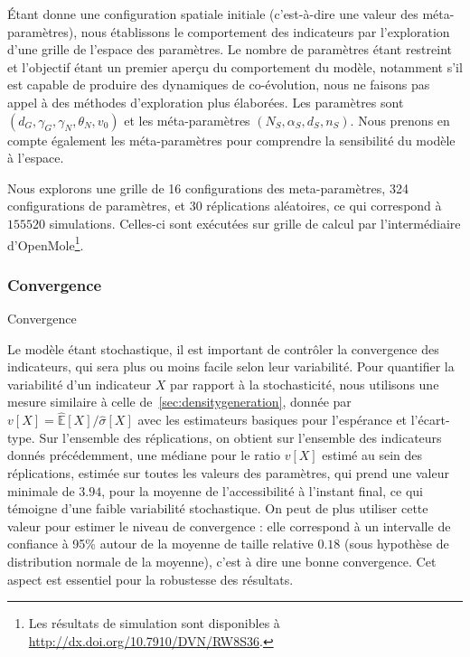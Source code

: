 Étant donne une configuration spatiale initiale (c'est-à-dire une valeur des méta-paramètres), nous établissons le comportement des indicateurs par l'exploration d'une grille de l'espace des paramètres. Le nombre de paramètres étant restreint et l'objectif étant un premier aperçu du comportement du modèle, notamment s'il est capable de produire des dynamiques de co-évolution, nous ne faisons pas appel à des méthodes d'exploration plus élaborées. Les paramètres sont $(d_G,\gamma_G,\gamma_N,\theta_N,v_0)$ et les méta-paramètres $(N_S,\alpha_S,d_S,n_S)$. Nous prenons en compte également les méta-paramètres pour comprendre la sensibilité du modèle à l'espace.

Nous explorons une grille de 16 configurations des meta-paramètres, 324 configurations de paramètres, et 30 réplications aléatoires, ce qui correspond à $155520$ simulations. Celles-ci sont exécutées sur grille de calcul par l'intermédiaire d'OpenMole\footnote{Les résultats de simulation sont disponibles à \url{http://dx.doi.org/10.7910/DVN/RW8S36}.}.



\subsubsection{Convergence}{Convergence}


Le modèle étant stochastique, il est important de contrôler la convergence des indicateurs, qui sera plus ou moins facile selon leur variabilité. Pour quantifier la variabilité d'un indicateur $X$ par rapport à la stochasticité, nous utilisons une mesure similaire à celle de~\ref{sec:densitygeneration}, donnée par $v\left[X\right] = \hat{\mathbb{E}}\left[X\right]/\hat{\sigma}\left[X\right]$ avec les estimateurs basiques pour l'espérance et l'écart-type. Sur l'ensemble des réplications, on obtient sur l'ensemble des indicateurs donnés précédemment, une médiane pour le ratio $v\left[X\right]$ estimé au sein des réplications, estimée sur toutes les valeurs des paramètres, qui prend une valeur minimale de $3.94$, pour la moyenne de l'accessibilité à l'instant final, ce qui témoigne d'une faible variabilité stochastique. On peut de plus utiliser cette valeur pour estimer le niveau de convergence : elle correspond à un intervalle de confiance à 95\% autour de la moyenne de taille relative $0.18$ (sous hypothèse de distribution normale de la moyenne), c'est à dire une bonne convergence. Cet aspect est essentiel pour la robustesse des résultats.





